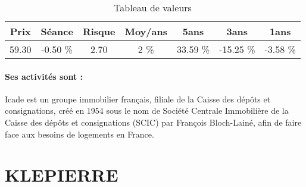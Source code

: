 \documentclass[11pt,a4paper]{report}%
\begin{document}
\begin{table}[H]
  \centering
    \begin{tabular}{|c|c|c|c|c|c|c|}
    \hline
    Prix & Séance & Risque  & Moy/ans & 5ans & 3ans & 1ans \\
    \hline
    59.30 &    -0.50 \%    & 2.70 & 2 \% & 33.59 \% & -15.25 \% & -3.58 \% \\
    \hline
    \end{tabular}%
        \label{tab:table_ICADE}%
      \caption{Tableau de valeurs}
\end{table}%

\paragraph{Ses activités sont : } Icade est un groupe immobilier français, filiale de la Caisse des dépôts et consignations, créé en 1954 sous le nom de Société Centrale Immobilière de la Caisse des dépôts et consignations (SCIC) par François Bloch-Lainé, afin de faire face aux besoins de logements en France. 
    
    \newpage

\section{KLEPIERRE}
\end{document}
